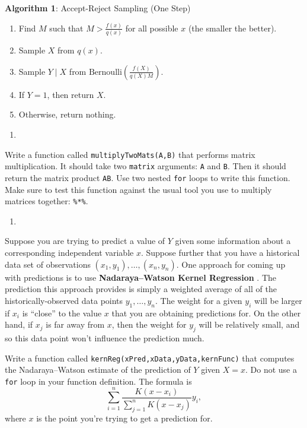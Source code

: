 \documentclass[12pt,krantz2]{krantz}
\providecommand{\tightlist}{%
  \setlength{\itemsep}{0pt}\setlength{\parskip}{0pt}}
\begin{document}
\textbf{Algorithm 1}: Accept-Reject Sampling (One Step)

\begin{enumerate}
\def\labelenumi{\roman{enumi}.}
\tightlist
\item
  Find \(M\) such that \(M > \frac{f(x)}{q(x)}\) for all possible \(x\) (the smaller the better).
\item
  Sample \(X\) from \(q(x)\).
\item
  Sample \(Y \mid X\) from \(\text{Bernoulli}\left(\frac{f(X)}{q(X)M}\right)\).
\item
  If \(Y = 1\), then return \(X\).
\item
  Otherwise, return nothing.
\end{enumerate}

\begin{enumerate}
\def\labelenumi{\arabic{enumi}.}
\setcounter{enumi}{2}
\item
\end{enumerate}

Write a function called \texttt{multiplyTwoMats(A,B)} that performs matrix multiplication. It should take two \texttt{matrix} arguments: \texttt{A} and \texttt{B}. Then it should return the matrix product \texttt{AB}. Use two nested \texttt{for} loops to write this function. Make sure to test this function against the usual tool you use to multiply matrices together: \texttt{\%*\%}.

\begin{enumerate}
\def\labelenumi{\arabic{enumi}.}
\setcounter{enumi}{3}
\item
\end{enumerate}

Suppose you are trying to predict a value of \(Y\) given some information about a corresponding independent variable \(x\). Suppose further that you have a historical data set of observations \((x_1, y_1), \ldots, (x_n,y_n)\). One approach for coming up with predictions is to use \textbf{Nadaraya--Watson Kernel Regression} \citep{Nadaraya} \citep{Watson}. The prediction this approach provides is simply a weighted average of all of the historically-observed data points \(y_1, \ldots, y_n\). The weight for a given \(y_i\) will be larger if \(x_i\) is ``close'' to the value \(x\) that you are obtaining predictions for. On the other hand, if \(x_j\) is far away from \(x\), then the weight for \(y_j\) will be relatively small, and so this data point won't influence the prediction much.

Write a function called \texttt{kernReg(xPred,xData,yData,kernFunc)} that computes the Nadaraya--Watson estimate of the prediction of \(Y\) given \(X=x\). Do not use a \texttt{for} loop in your function definition. The formula is
\begin{equation} 
\sum_{i=1}^n \frac{K(x-x_i)}{\sum_{j=1}^n K(x-x_j) } y_i,
\end{equation}
where \(x\) is the point you're trying to get a prediction for.
\end{document}
